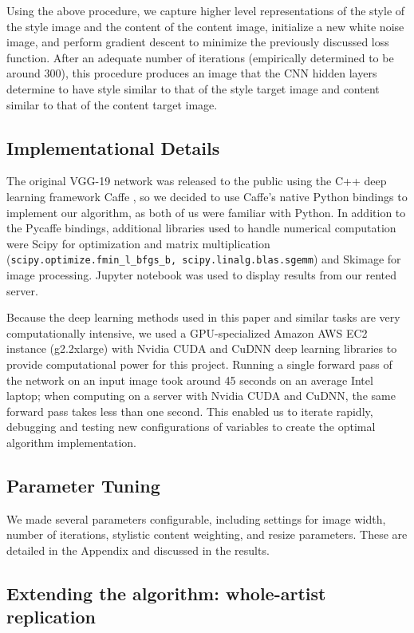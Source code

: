 \documentclass[11pt,letterpaper,journal]{IEEEtran}
\begin{document}
Using the above procedure, we capture higher level representations of the
style of the style image and the content of the content image, initialize a new
white noise image, and perform
gradient descent to minimize the previously discussed loss function.
After an adequate number of iterations (empirically determined to be around
300), this procedure produces an image that the CNN hidden layers
determine to have style similar to that of the style target image and content
similar to that of the content target image.

\subsection{Implementational Details}

The original VGG-19 network was released to the public using the C++ deep
learning framework Caffe \cite{jia14}, so we decided to use Caffe's native
Python bindings to implement our algorithm, as both of us were familiar with
Python. In addition to the Pycaffe bindings, additional libraries used to
handle numerical computation were Scipy for optimization and matrix
multiplication (\texttt{scipy.optimize.fmin\_l\_bfgs\_b,
scipy.linalg.blas.sgemm}) and Skimage for image processing. Jupyter notebook
was used to display results from our rented server.

Because the deep learning methods used in this paper and similar tasks are very
computationally intensive, we used a GPU-specialized Amazon AWS EC2 instance
(g2.2xlarge) with Nvidia CUDA and CuDNN deep learning libraries to provide computational power for this project. Running a single
forward pass of the network on an input image took around 45 seconds on an
average Intel laptop; when computing on a server with Nvidia CUDA and CuDNN,
the same forward pass takes less than one second. This enabled us to iterate
rapidly, debugging and testing new configurations of variables to create the
optimal algorithm implementation.

\subsection{Parameter Tuning}

We made several parameters configurable, including settings for image width,
number of iterations, stylistic content weighting, and resize parameters. These
are detailed in the Appendix and discussed in the results.

\subsection{Extending the algorithm: whole-artist replication}
\end{document}
